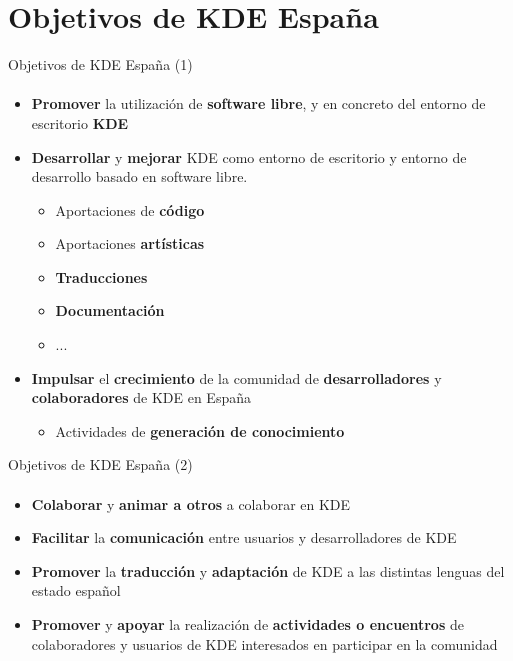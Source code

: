 \documentclass[12pt]{beamer}
\begin{document}
\section{Objetivos de KDE España}

\begin{frame}{Objetivos de KDE España (1)}
  \framesubtitle{}
  \begin{itemize}
    \item \textbf{Promover} la utilización de \textbf{software libre}, y en concreto del entorno de escritorio \textbf{KDE}
    \item \textbf{Desarrollar} y \textbf{mejorar} KDE como entorno de escritorio y entorno de desarrollo basado en software libre.
    \begin{itemize}
      \item Aportaciones de \textbf{código}
      \item Aportaciones \textbf{artísticas}
      \item \textbf{Traducciones}
      \item \textbf{Documentación}
      \item ...
    \end{itemize}
    \item \textbf{Impulsar} el \textbf{crecimiento} de la comunidad de \textbf{desarrolladores} y \textbf{colaboradores} de KDE en España
    \begin{itemize}
      \item Actividades de \textbf{generación de conocimiento}
    \end{itemize}
  \end{itemize}
\end{frame}

\begin{frame}{Objetivos de KDE España (2)}
  \framesubtitle{}
  \begin{itemize}
    \item \textbf{Colaborar} y \textbf{animar a otros} a colaborar en KDE
    \item \textbf{Facilitar} la \textbf{comunicación} entre usuarios y desarrolladores de KDE
    \item \textbf{Promover} la \textbf{traducción} y \textbf{adaptación} de KDE a las distintas lenguas del estado español
    \item \textbf{Promover} y \textbf{apoyar} la realización de \textbf{actividades o encuentros} de colaboradores y usuarios de KDE 
          interesados en participar en la comunidad
  \end{itemize}
\end{frame}
\end{document}
